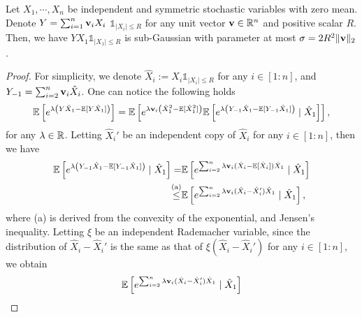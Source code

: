 \begin{lemma}\label{aux-1}
    Let $X_1,\cdots,X_n$ be independent and symmetric stochastic variables with zero mean. Denote $Y=\sum_{i=1}^n \mathbf{v}_iX_i$ $\mathds{1}_{|X_i|\leq R}$ for any unit vector $\mathbf{v}\in\mathbb{R}^n$ and positive scalar $R$. Then, we have $YX_1\mathds{1}_{|X_1|\leq R}$ is sub-Gaussian with parameter at most $\sigma=2R^2\|\mathbf{v}\|_2$.
\end{lemma}
\begin{proof}
    For simplicity, we denote $\hat{X}_i:=X_i\mathds{1}_{|X_i|\leq R}$ for any $i\in[1:n]$, and $Y_{-1}=\sum_{i=2}^n\mathbf{v}_i\hat{X}_i$. One can notice the following holds
    \begin{align}\label{sub-gau-1}
        \mathbb{E}\left[e^{\lambda \left(Y\hat{X}_1-\mathbb{E}[Y\hat{X}_1]\right)}\right]=\mathbb{E}\left[e^{\lambda\mathbf{v}_i\left(\hat{X}_1^2-\mathbb{E}[\hat{X}_1^2]\right)}\mathbb{E}\left[e^{\lambda\left(Y_{-1}\hat{X}_1-\mathbb{E}[Y_{-1}\hat{X}_1]\right)}\mid \hat{X}_1\right]\right],
    \end{align}
    for any $\lambda\in\mathbb{R}$. Letting $\hat{X}_i'$ be an independent copy of $\hat{X}_i$ for any $i\in[1:n]$, then we have
    \begin{align}\label{sub-gau-2}
        \mathbb{E}\left[e^{\lambda\left(Y_{-1}\hat{X}_1-\mathbb{E}[Y_{-1}\hat{X}_1]\right)}\mid \hat{X}_1\right]=&\mathbb{E}\left[e^{\sum_{i=2}^n\lambda\mathbf{v}_i(\hat{X}_i-\mathbb{E}[\hat{X}_i])\hat{X}_1}\mid\hat{X}_1\right]
        \notag
        \\
        \overset{\text{(a)}}{\leq}&\mathbb{E}\left[e^{\sum_{i=2}^n\lambda\mathbf{v}_i(\hat{X}_i-\hat{X}_i')\hat{X}_1}\mid\hat{X}_1\right],
    \end{align}
    where (a) is derived from the convexity of the exponential, and Jensen’s inequality. Letting $\xi$ be an independent Rademacher variable, since the distribution of $\hat{X}_i-\hat{X}_i'$ is the same as that of $\xi(\hat{X}_i-\hat{X}_i')$ for any $i\in[1:n]$, we obtain
    \begin{align}\label{sub-gau-3}
        \bbE\left[e^{\sum_{i=2}^n\lambda\upv_i(\hat{X}_i-\hat{X}_i')\hat{X}_1}\mid\hat{X}_1\right]

\end{align}
\end{proof}
